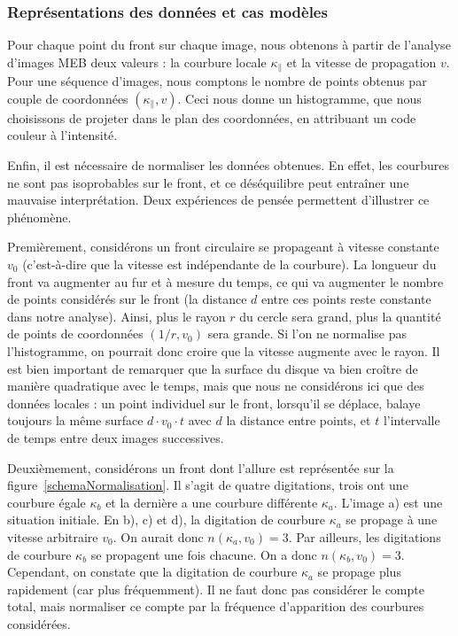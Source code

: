 			\subsubsection{Représentations des données et cas modèles}
Pour chaque point du front sur chaque image, nous obtenons à partir de l'analyse d'images MEB deux valeurs : la courbure locale $\kappa_\parallel$ et la vitesse de propagation $v$. Pour une séquence d’images, nous comptons le nombre de points obtenus par couple de coordonnées $(\kappa_\parallel,v)$. Ceci nous donne un histogramme, que nous choisissons de projeter dans le plan des coordonnées, en attribuant un code couleur à l’intensité.\par 
Enfin, il est nécessaire de normaliser les données obtenues. En effet, les courbures ne sont pas isoprobables sur le front, et ce déséquilibre peut entraîner une mauvaise interprétation. Deux expériences de pensée permettent d’illustrer ce phénomène.\par 
Premièrement, considérons un front circulaire se propageant à vitesse constante $v_0$ (c’est-à-dire que la vitesse est indépendante de la courbure). La longueur du front va augmenter au fur et à mesure du temps, ce qui va augmenter le nombre de points considérés sur le front (la distance $d$ entre ces points reste constante dans notre analyse). Ainsi, plus le rayon $r$ du cercle sera grand, plus la quantité de points de coordonnées $(1/r,v_0)$ sera grande. Si l’on ne normalise pas l’histogramme, on pourrait donc croire que la vitesse augmente avec le rayon. Il est bien important de remarquer que la surface du disque va bien croître de manière quadratique avec le temps, mais que nous ne considérons ici que des données locales : un point individuel sur le front, lorsqu’il se déplace, balaye toujours la même surface $d \cdot v_0 \cdot t$ avec $d$ la distance entre points, et $t$ l’intervalle de temps entre deux images successives.\par
Deuxièmement, considérons un front dont l’allure est représentée sur la figure~\ref{schemaNormalisation}. Il s'agit de quatre digitations, trois ont une courbure égale $\kappa_b$ et la dernière a une courbure différente $\kappa_a$. L'image a) est une situation initiale. En b), c) et d), la digitation de courbure $\kappa_a$ se propage à une vitesse arbitraire $v_0$. On aurait donc $n(\kappa_a,v_0)=3$. Par ailleurs, les digitations de courbure $\kappa_b$ se propagent une fois chacune. On a donc $n(\kappa_b,v_0)=3$. Cependant, on constate que la digitation de courbure $\kappa_a$ se propage plus rapidement (car plus fréquemment). Il ne faut donc pas considérer le compte total, mais normaliser ce compte par la fréquence d'apparition des courbures considérées.\par 
